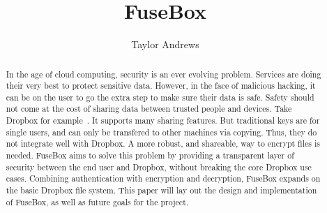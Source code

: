 \documentclass[11pt,twocolumn,letterpaper]{article}
\newcommand{\appname}{FuseBox }
\newcommand{\appnameWOspace}{FuseBox}
\begin{document}
\title{\appname}

\author{Taylor Andrews}

\maketitle

\begin{abstract}
In the age of cloud computing, security is an ever evolving problem. 
Services are doing their very best to protect sensitive data. 
However, in the face of malicious hacking, it can be on the user to go the extra step to make sure
their data is safe. Safety should not come at the cost of
sharing data between trusted people and devices. Take Dropbox for
example~\cite{dropbox}. 
It supports many sharing features. But traditional keys are for single
users, and can only be transfered to other machines via
copying. Thus, they do not integrate well with Dropbox. 
A more robust,
and shareable, way to encrypt files is needed. 
\appname aims to solve this problem by providing a
transparent layer of security between the end user and Dropbox,
without breaking the core Dropbox use cases.
Combining authentication with encryption and decryption, \appname
expands on the basic Dropbox file system.  
This paper will lay out
the design and implementation of \appnameWOspace, as well as 
future goals for the project.    
\end{abstract}
\end{document}
